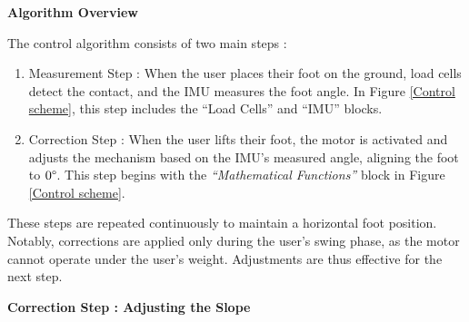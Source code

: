 \documentclass[lettersize,journal]{IEEEtran}
\begin{document}
\noindent \textbf{Algorithm Overview}

\noindent The control algorithm consists of two main steps :

\begin{enumerate}
    \item Measurement Step : When the user places their foot on the ground, load cells detect the contact, and the IMU measures the foot angle. In Figure \ref{Control scheme}, this step includes the “Load Cells” and “IMU” blocks.

    \item Correction Step : When the user lifts their foot, the motor is activated and adjusts the mechanism based on the IMU’s measured angle, aligning the foot to $0\degree$. This step begins with the \textit{“Mathematical Functions”} block in Figure \ref{Control scheme}.
\end{enumerate}

These steps are repeated continuously to maintain a horizontal foot position. Notably, corrections are applied only during the user’s swing phase, as the motor cannot operate under the user’s weight. Adjustments are thus effective for the next step.


\medskip
\noindent \textbf{Correction Step : Adjusting the Slope}
\end{document}
